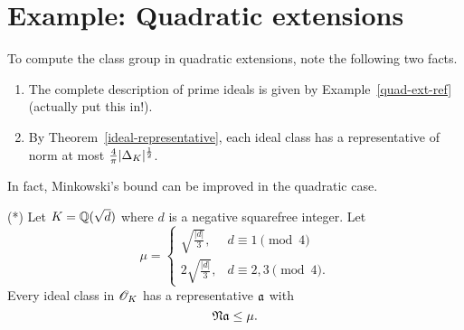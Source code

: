 \section{Example: Quadratic extensions}
To compute the class group in quadratic extensions, note the following two facts.
\begin{enumerate}
\item
The complete description of prime ideals is given by Example~\ref{quad-ext-ref} (actually put this in!).
\item
By Theorem~\ref{ideal-representative}, each ideal class has a representative of norm at most $\frac{4}{\pi}|\Delta_K|^{\frac{1}{2}}$.
\end{enumerate}
In fact, Minkowski's bound can be improved in the quadratic case.
\begin{thm}(*)
Let $K=\mathbb{Q}(\sqrt{d})$ where $d$ is a negative squarefree integer. Let
\[
\mu = \begin{cases}
\sqrt{\frac{|d|}3},&d\equiv 1\pmod 4\\
2\sqrt{\frac{|d|}3},&d\equiv 2,3\pmod 4.
\end{cases}
\]
Every ideal class in $\mathscr{O}_K$ has a representative $\mathfrak{a}$ with
\[
\mathfrak N\mathfrak{a}\le\mu.
\]
\end{thm}
